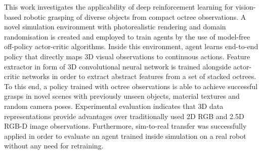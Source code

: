 This work investigates the applicability of deep reinforcement learning for vision-based robotic grasping of diverse objects from compact octree observations. A novel simulation environment with photorealistic rendering and domain randomisation is created and employed to train agents by the use of model-free off-policy actor-critic algorithms. Inside this environment, agent learns end-to-end policy that directly maps 3D visual observations to continuous actions. Feature extractor in form of 3D convolutional neural network is trained alongside actor-critic networks in order to extract abstract features from a set of stacked octrees. To this end, a policy trained with octree observations is able to achieve successful grasps in novel scenes with previously unseen objects, material textures and random camera poses. Experimental evaluation indicates that 3D data representations provide advantages over traditionally used 2D RGB and 2.5D RGB-D image observations. Furthermore, sim-to-real transfer was successfully applied in order to evaluate an agent trained inside simulation on a real robot without any need for retraining.
